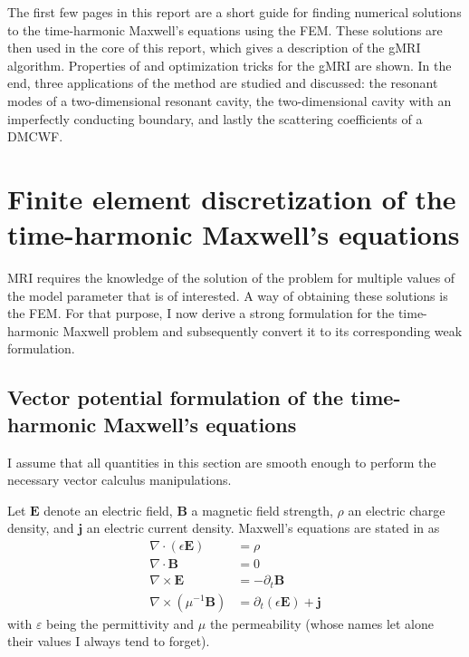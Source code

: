 \documentclass[11pt, a4paper]{article}
\begin{document}
The first few pages in this report are a short guide for finding numerical 
solutions to the time-harmonic Maxwell's equations using the \acrfull{FEM}.
These solutions are then used in the core of this report, which gives a description
of the \acrfull{gMRI} algorithm. Properties of and optimization tricks for the
\acrshort{gMRI} are shown. In the end, three applications of the method are studied and
discussed: the resonant modes of a two-dimensional resonant cavity,
the two-dimensional cavity with an imperfectly conducting boundary, and lastly
the scattering coefficients of a \acrfull{DMCWF}.

\newpage
\section{Finite element discretization of the time-harmonic Maxwell's equations}
\label{sec:maxwell}

\acrfull{MRI} requires the knowledge of the solution of the problem for multiple 
values of the model parameter that is of interested. A way of obtaining these
solutions is the \acrfull{FEM}. For that purpose, I now derive a strong formulation
for the time-harmonic Maxwell problem and subsequently convert it to its
corresponding weak formulation.

\subsection{Vector potential formulation of the time-harmonic Maxwell's equations}
\label{subsec:maxwell-potential}

I assume that all quantities in this section are smooth enough to perform the
necessary vector calculus manipulations.

Let $\mathbf{E}$ denote an electric field, $\mathbf{B}$ a magnetic field
strength, $\rho$ an electric charge density, and $\mathbf{j}$ an electric
current density. Maxwell's equations are stated in \citep{monk} as
\begin{align}
    \nabla \cdot (\epsilon \mathbf{E}) &= \rho \label{equ:maxwell1} \\
    \nabla \cdot \mathbf{B} &= 0 \label{equ:maxwell2} \\
    \nabla \times \mathbf{E} &= -\partial_t \mathbf{B} \label{equ:maxwell3} \\
    \nabla \times (\mu^{-1} \mathbf{B}) &= \partial_t (\epsilon \mathbf{E}) + \mathbf{j} \label{equ:maxwell4}
\end{align}
with $\varepsilon$ being the permittivity and $\mu$ the permeability (whose names 
let alone their values I always tend to forget).
\end{document}
